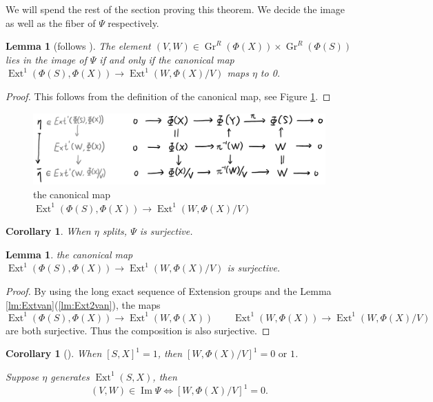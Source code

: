 \documentclass[reqno,11pt]{amsart}
\numberwithin{equation}{section}
\theoremstyle{plain}
\newtheorem{lemma}[theorem]{Lemma}
\newtheorem{corollary}[theorem]{Corollary}
\theoremstyle{plain}
\numberwithin{equation}{section}
\theoremstyle{remark}
\DeclareMathOperator{\Img}{\operatorname{Im}}
\DeclareMathOperator{\Ext}{\operatorname{Ext}}
\newcommand{\Grr}{\operatorname{Gr}^{R}}
\begin{document}
We will spend the rest of the section proving this theorem. We decide the image as well as the fiber of $\Psi$ respectively.
\begin{lemma}[follows {\cite[Lemma 21]{irelli2019cell}}]
The element $(V,W) \in \Grr(\Phi(X)) \times \Grr(\Phi(S))$ lies in the image of $\Psi$ if and only if the canonical map $\Ext^1(\Phi(S),\Phi(X)) \longrightarrow \Ext^1(W,\Phi(X)/V)$ maps $\eta$ to 0.
\end{lemma}
\begin{proof}
	This follows from the definition of the canonical map, see Figure \ref{fig:extensiongroup}.
\end{proof}
\begin{center}
	\begin{figure}[ht]
		\vspace{0cm}
		\centering
		\includegraphics[width=15cm]{figures/extensiongroup.png}
		\caption{the canonical map $\Ext^1(\Phi(S),\Phi(X)) \longrightarrow \Ext^1(W,\Phi(X)/V)$}
		\label{fig:extensiongroup}
	\end{figure}
\end{center}
\begin{corollary}\label{cor:img1}
	When $\eta$ splits, $\Psi$ is surjective.
\end{corollary}
\begin{lemma}
	the canonical map $\Ext^1(\Phi(S),\Phi(X)) \longrightarrow \Ext^1(W,\Phi(X)/V)$ is surjective.
\end{lemma}
\begin{proof}
	By using the long exact sequence of Extension groups and the Lemma \ref{lm:Extvan}(\ref{lm:Ext2van}), the maps
	$$\Ext^1(\Phi(S),\Phi(X)) \longrightarrow \Ext^1(W,\Phi(X))\qquad \Ext^1(W,\Phi(X)) \longrightarrow \Ext^1(W,\Phi(X)/V)$$
	are both surjective. Thus the composition is also surjective.
\end{proof}
\begin{corollary}[]\label{cor:0or1}
	When $[S,X]^1=1$, then $[W,\Phi(X)/V]^1=0 \text{ or }1$.
	
	Suppose $\eta$ generates $\Ext^1(S,X)$, then 
	$$(V,W) \in \Img \Psi \iff [W,\Phi(X)/V]^1=0.$$
\end{corollary}
\end{document}
